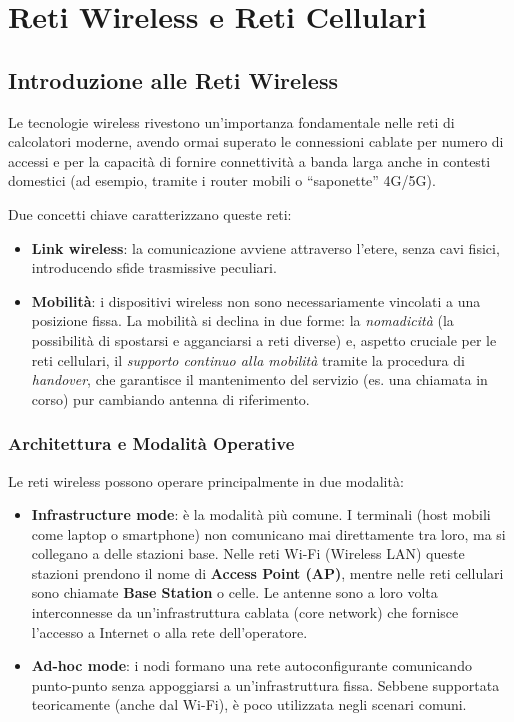 \chapter{Reti Wireless e Reti Cellulari}

\section{Introduzione alle Reti Wireless}
Le tecnologie wireless rivestono un'importanza fondamentale nelle reti di calcolatori moderne, avendo ormai superato le connessioni cablate per numero di accessi e per la capacità di fornire connettività a banda larga anche in contesti domestici (ad esempio, tramite i router mobili o ``saponette'' 4G/5G).

Due concetti chiave caratterizzano queste reti:
\begin{itemize}
    \item \textbf{Link wireless}: la comunicazione avviene attraverso l'etere, senza cavi fisici, introducendo sfide trasmissive peculiari.
    \item \textbf{Mobilità}: i dispositivi wireless non sono necessariamente vincolati a una posizione fissa. La mobilità si declina in due forme: la \textit{nomadicità} (la possibilità di spostarsi e agganciarsi a reti diverse) e, aspetto cruciale per le reti cellulari, il \textit{supporto continuo alla mobilità} tramite la procedura di \textit{handover}, che garantisce il mantenimento del servizio (es. una chiamata in corso) pur cambiando antenna di riferimento.
\end{itemize}

\subsection{Architettura e Modalità Operative}
Le reti wireless possono operare principalmente in due modalità:
\begin{itemize}
    \item \textbf{Infrastructure mode}: è la modalità più comune. I terminali (host mobili come laptop o smartphone) non comunicano mai direttamente tra loro, ma si collegano a delle stazioni base. Nelle reti Wi-Fi (Wireless LAN) queste stazioni prendono il nome di \textbf{Access Point (AP)}, mentre nelle reti cellulari sono chiamate \textbf{Base Station} o celle. Le antenne sono a loro volta interconnesse da un'infrastruttura cablata (core network) che fornisce l'accesso a Internet o alla rete dell'operatore.
    \item \textbf{Ad-hoc mode}: i nodi formano una rete autoconfigurante comunicando punto-punto senza appoggiarsi a un'infrastruttura fissa. Sebbene supportata teoricamente (anche dal Wi-Fi), è poco utilizzata negli scenari comuni.
\end{itemize}

